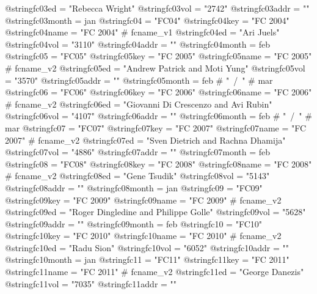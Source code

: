 @string{fc03ed =                "Rebecca Wright"}
@string{fc03vol =               "2742"}
@string{fc03addr =              ""}
@string{fc03month =             jan}
@string{fc04 =                  "FC04"}
@string{fc04key =               "FC 2004"}
@string{fc04name =              "FC 2004" # fcname_v1}
@string{fc04ed =                "Ari Juels"}
@string{fc04vol =               "3110"}
@string{fc04addr =              ""}
@string{fc04month =             feb}
@string{fc05 =                  "FC05"}
@string{fc05key =               "FC 2005"}
@string{fc05name =              "FC 2005" # fcname_v2}
@string{fc05ed =                "Andrew Patrick and Moti Yung"}
@string{fc05vol =               "3570"}
@string{fc05addr =              ""}
@string{fc05month =             feb # "~/~" # mar}
@string{fc06 =                  "FC06"}
@string{fc06key =               "FC 2006"}
@string{fc06name =              "FC 2006" # fcname_v2}
@string{fc06ed =                "Giovanni {Di Crescenzo} and Avi Rubin"}
@string{fc06vol =               "4107"}
@string{fc06addr =              ""}
@string{fc06month =             feb # "~/~" # mar}
@string{fc07 =                  "FC07"}
@string{fc07key =               "FC 2007"}
@string{fc07name =              "FC 2007" # fcname_v2}
@string{fc07ed =                "Sven Dietrich and Rachna Dhamija"}
@string{fc07vol =               "4886"}
@string{fc07addr =              ""}
@string{fc07month =             feb}
@string{fc08 =                  "FC08"}
@string{fc08key =               "FC 2008"}
@string{fc08name =              "FC 2008" # fcname_v2}
@string{fc08ed =                "Gene Tsudik"}
@string{fc08vol =               "5143"}
@string{fc08addr =              ""}
@string{fc08month =             jan}
@string{fc09 =                  "FC09"}
@string{fc09key =               "FC 2009"}
@string{fc09name =              "FC 2009" # fcname_v2}
@string{fc09ed =                "Roger Dingledine and Philippe Golle"}
@string{fc09vol =               "5628"}
@string{fc09addr =              ""}
@string{fc09month =             feb}
@string{fc10 =                  "FC10"}
@string{fc10key =               "FC 2010"}
@string{fc10name =              "FC 2010" # fcname_v2}
@string{fc10ed =                "Radu Sion"}
@string{fc10vol =               "6052"}
@string{fc10addr =              ""}
@string{fc10month =             jan}
@string{fc11 =                  "FC11"}
@string{fc11key =               "FC 2011"}
@string{fc11name =              "FC 2011" # fcname_v2}
@string{fc11ed =                "George Danezis"}
@string{fc11vol =               "7035"}
@string{fc11addr =              ""}
